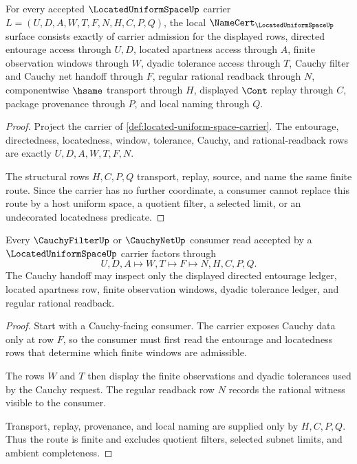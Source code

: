 \begin{theorem}\label{thm:located-uniform-space-namecert-obligations}
For every accepted $\LocatedUniformSpaceUp$ carrier $L=(U,D,A,W,T,F,N,H,C,P,Q)$, the local $\NameCert_{\LocatedUniformSpaceUp}$ surface consists exactly of carrier admission for the displayed rows, directed entourage access through $U,D$, located apartness access through $A$, finite observation windows through $W$, dyadic tolerance access through $T$, Cauchy filter and Cauchy net handoff through $F$, regular rational readback through $N$, componentwise $\hsame$ transport through $H$, displayed $\Cont$ replay through $C$, package provenance through $P$, and local naming through $Q$.
\end{theorem}
\begin{proof}
Project the carrier of \autoref{def:located-uniform-space-carrier}. The entourage, directedness, locatedness, window, tolerance, Cauchy, and rational-readback rows are exactly $U,D,A,W,T,F,N$.

The structural rows $H,C,P,Q$ transport, replay, source, and name the same finite route. Since the carrier has no further coordinate, a consumer cannot replace this route by a host uniform space, a quotient filter, a selected limit, or an undecorated locatedness predicate.
\end{proof}

\begin{theorem}\label{thm:located-uniform-space-cauchy-filter-route}
Every $\CauchyFilterUp$ or $\CauchyNetUp$ consumer read accepted by a $\LocatedUniformSpaceUp$ carrier factors through
$$
U,D,A \longmapsto W,T \longmapsto F \longmapsto N,H,C,P,Q .
$$
The Cauchy handoff may inspect only the displayed directed entourage ledger, located apartness row, finite observation windows, dyadic tolerance ledger, and regular rational readback.
\end{theorem}
\begin{proof}
Start with a Cauchy-facing consumer. The carrier exposes Cauchy data only at row $F$, so the consumer must first read the entourage and locatedness rows that determine which finite windows are admissible.

The rows $W$ and $T$ then display the finite observations and dyadic tolerances used by the Cauchy request. The regular readback row $N$ records the rational witness visible to the consumer.

Transport, replay, provenance, and local naming are supplied only by $H,C,P,Q$. Thus the route is finite and excludes quotient filters, selected subnet limits, and ambient completeness.
\end{proof}

